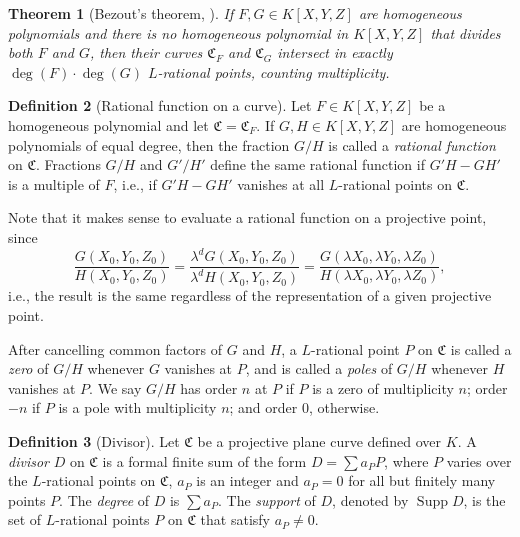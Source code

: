 \documentclass[11pt, oneside]{amsart}
\newtheorem{thm}{Theorem}[section]
\theoremstyle{definition}
\newtheorem{defn}[thm]{Definition}
\theoremstyle{remark}
\numberwithin{equation}{section}
\DeclareMathOperator{\Supp}{Supp}
\begin{document}
\begin{thm}[Bezout's theorem, \cite{Wal00}] %
	If $F, G \in K[X, Y, Z]$ are homogeneous polynomials and there is no homogeneous polynomial in $K[X, Y, Z]$ that divides both $F$ and $G$, then their curves $\mathfrak C_F$ and $\mathfrak C_G$ intersect in exactly $\deg(F) \cdot \deg(G)$ $L$-rational points, counting multiplicity.
\end{thm}

%

\begin{defn}[Rational function on a curve]
	Let $F \in K[X, Y, Z]$ be a homogeneous polynomial and let $\mathfrak C = \mathfrak C_F$.
	If $G, H \in K[X, Y, Z]$ are homogeneous polynomials of equal degree, then the fraction $G/H$ is called a \emph{rational function} on $\mathfrak C$.
	Fractions $G/H$ and $G'/H'$ define the same rational function if $G'H - GH'$ is a multiple of $F$, i.e., if  $G'H - GH'$ vanishes at all $L$-rational points on $\mathfrak C$.
\end{defn}

	Note that it makes sense to evaluate a rational function on a projective point, since \[
		\frac{G(X_0, Y_0, Z_0)}{H(X_0, Y_0, Z_0)} = \frac{\lambda^d G(X_0, Y_0, Z_0)}{\lambda^d H(X_0, Y_0, Z_0)} = \frac{G(\lambda X_0, \lambda Y_0, \lambda Z_0)}{H(\lambda X_0, \lambda Y_0, \lambda Z_0)},
	\]
	i.e., the result is the same regardless of the representation of a given projective point.

	After cancelling common factors of $G$ and $H$, a $L$-rational point $P$ on $\mathfrak C$ is called a \emph{zero} of $G/H$ whenever $G$ vanishes at $P$, and is called a \emph{poles} of $G/H$ whenever $H$ vanishes at $P$.  
	We say $G/H$ has order $n$ at $P$ if $P$ is a zero of multiplicity $n$; order $-n$ if $P$ is a pole with multiplicity $n$; and order $0$, otherwise.

\begin{defn}[Divisor] 
	Let $\mathfrak C$ be a projective plane curve defined over $K$.
	A \emph{divisor} $D$ on $\mathfrak C$ is a formal finite sum of the form $D = \sum a_P P$, where $P$ varies over the $L$-rational points on $\mathfrak C$, $a_P$ is an integer and $a_P = 0$ for all but finitely many points $P$.
	The \emph{degree} of $D$ is $\sum a_P$.
	The \emph{support} of $D$, denoted by $\Supp D$, is the set of $L$-rational points $P$ on $\mathfrak C$ that satisfy $a_P \neq 0$.
\end{defn}
\end{document}
